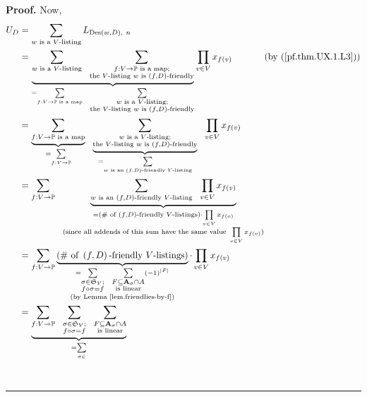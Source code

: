 \documentclass[numbers=enddot,12pt,final,onecolumn,notitlepage]{scrartcl}%
\numberwithin{exer}{section}
\theoremstyle{definition}
\newenvironment{proof}[1][Proof]{\noindent\textbf{#1.} }{\ \rule{0.5em}{0.5em}}
\let\sumnonlimits\sum
\let\prodnonlimits\prod
\renewcommand{\sum}{\sumnonlimits\limits}
\renewcommand{\prod}{\prodnonlimits\limits}
\newenvironment{verlong}{}{}
\begin{document}
\begin{proof}
\begin{verlong}
Now,%
\begin{align*}
U_{D}  &  =\sum_{w\text{ is a }V\text{-listing}}L_{\operatorname*{Des}\left(
w,D\right)  ,\ n}\\
&  =\underbrace{\sum_{w\text{ is a }V\text{-listing}}\ \ \sum
_{\substack{f:V\rightarrow\mathbb{P}\text{ is a map};\\\text{the
}V\text{-listing }w\text{ is }\left(  f,D\right)  \text{-friendly}}}}%
_{=\sum_{f:V\rightarrow\mathbb{P}\text{ is a map}}\ \ \sum_{\substack{w\text{
is a }V\text{-listing;}\\\text{the }V\text{-listing }w\text{ is }\left(
f,D\right)  \text{-friendly}}}}\prod_{v\in V}x_{f\left(  v\right)
}\ \ \ \ \ \ \ \ \ \ \left(  \text{by (\ref{pf.thm.UX.1.L3})}\right) \\
&  =\underbrace{\sum_{f:V\rightarrow\mathbb{P}\text{ is a map}}}%
_{=\sum_{f:V\rightarrow\mathbb{P}}}\ \ \underbrace{\sum_{\substack{w\text{ is
a }V\text{-listing;}\\\text{the }V\text{-listing }w\text{ is }\left(
f,D\right)  \text{-friendly}}}}_{=\sum_{w\text{ is an }\left(  f,D\right)
\text{-friendly }V\text{-listing}}}\ \ \prod_{v\in V}x_{f\left(  v\right)  }\\
&  =\sum_{f:V\rightarrow\mathbb{P}}\ \ \underbrace{\sum_{w\text{ is an
}\left(  f,D\right)  \text{-friendly }V\text{-listing}}\ \ \prod_{v\in
V}x_{f\left(  v\right)  }}_{\substack{=\left(  \text{\# of }\left(
f,D\right)  \text{-friendly }V\text{-listings}\right)  \cdot\prod_{v\in
V}x_{f\left(  v\right)  }\\\text{(since all addends of this sum have the same
value }\prod_{v\in V}x_{f\left(  v\right)  }\text{)}}}\\
&  =\sum_{f:V\rightarrow\mathbb{P}}\underbrace{\left(  \text{\# of }\left(
f,D\right)  \text{-friendly }V\text{-listings}\right)  }_{\substack{=\sum
_{\substack{\sigma\in\mathfrak{S}_{V};\\f\circ\sigma=f}}\ \ \sum
_{\substack{F\subseteq\mathbf{A}_{\sigma}\cap A\\\text{is linear}}}\left(
-1\right)  ^{\left\vert F\right\vert }\\\text{(by Lemma
\ref{lem.friendlies-by-f})}}}\cdot\prod_{v\in V}x_{f\left(  v\right)  }\\
&  =\underbrace{\sum_{f:V\rightarrow\mathbb{P}}\ \ \sum_{\substack{\sigma
\in\mathfrak{S}_{V};\\f\circ\sigma=f}}\ \ \sum_{\substack{F\subseteq
\mathbf{A}_{\sigma}\cap A\\\text{is linear}}}}_{=\sum_{\sigma\in
}}
\end{align*}
\end{verlong}
\end{proof}
\end{document}
